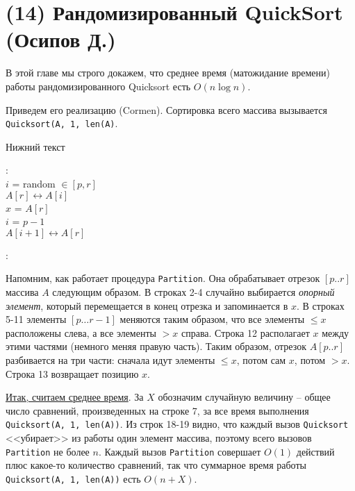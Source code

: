 \section{(14) Рандомизированный QuickSort (Осипов Д.)}

В этой главе мы строго докажем, что среднее время (матожидание времени) работы рандомизированного Quicksort есть $O(n\log n)$.

Приведем его реализацию (Cormen). Сортировка всего массива вызывается \texttt{Quicksort(A, 1, len(A)}.

\LinesNumbered
\begin{algorithm}[H]
\caption{Нижний текст}
:\\
$i$ = random $\in [p, r]$\\
$A[r] \leftrightarrow A[i]$\\
$x$ = $A[r]$ \\
$i$ = $p-1$ \\
$A[i+1] \leftrightarrow A[r]$\\

$ $\\

: \\
\end{algorithm}

Напомним, как работает процедура \texttt{Partition}. Она обрабатывает отрезок $[p..r]$ массива $A$ следующим образом.  В строках 2-4 случайно выбирается \textit{опорный элемент}, который перемещается в конец отрезка и запоминается в $x$. В строках 5-11 элементы $[p\ldots r-1]$ меняются таким образом, что все элементы $\leq x$ расположены слева, а все элементы $> x$ справа. Строка 12 располагает $x$ между этими частями (немного меняя правую часть). Таким образом, отрезок $A[p..r]$ разбивается на три части: сначала идут элементы $\leq x$, потом сам $x$, потом $> x$. Строка 13 возвращает позицию $x$.

\underline{Итак, считаем среднее время}. За $X$ обозначим случайную величину -- общее число сравнений, произведенных на строке 7, за все время выполнения \texttt{Quicksort(A, 1, len(A))}. Из строк 18-19 видно, что каждый вызов \texttt{Quicksort} <<убирает>> из работы один элемент массива, поэтому всего вызовов \texttt{Partition} не более $n$. Каждый вызов \texttt{Partition} совершает $O(1)$ действий плюс какое-то количество сравнений, так что суммарное время работы \texttt{Quicksort(A, 1, len(A))} есть $O(n+X)$.

